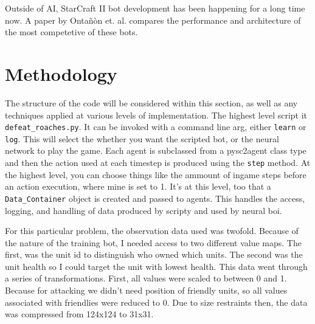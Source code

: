 \documentclass{amsart}
\theoremstyle{definition}
\begin{document}
Outside of AI, StarCraft II bot development has been happening for a long time now.
A paper by Onta\~n\`on et. al. compares the performance and architecture of the most competetive of these bots.












\section{Methodology}


The structure of the code will be considered within this section, as well as any techniques applied at various levels of implementation.
The highest level script it {\tt defeat\_roaches.py}.
It can be invoked with a command line arg, either {\tt learn} or {\tt log}.
This will select the whether you want the scripted bot, or the neural network to play the game.
Each agent is subclassed from a pysc2agent class type and then the action used at each timestep is produced using the {\tt step} method.
At the highest level, you can choose things like the ammount of ingame steps before an action execution, where mine is set to 1.
It's at this level, too that a {\tt Data\_Container} object is created and passed to agents.
This handles the access, logging, and handling of data produced by scripty and used by neural boi.

For this particular problem, the observation data used was twofold.
Because of the nature of the training bot, I needed access to two different value maps.
The first, was the unit id to distinguish who owned which units.
The second was the unit health so I could target the unit with lowest health.
This data went through a series of transformations.
First, all values were scaled to between 0 and 1.
Because for attacking we didn't need position of friendly units, so all values associated with friendlies were reduced to 0.
Due to size restraints then, the data was compressed from 124x124 to 31x31.
\end{document}
